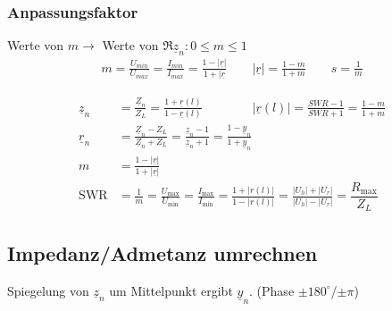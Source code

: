 \subsubsection{Anpassungsfaktor}
Werte von $ m \rightarrow$ Werte von $ \Re{\underline{z}_n}: 0 \leq m \leq1 $
\begin{align*}
	m = \frac{U_{min}}{U_{max}} = \frac{I_{min}}{I_{max}}=\frac{1-|\underline{r}|}{1+|\underline{r}} \qquad  |\underline{r}| = \frac{1-m}{1+m} \qquad s=\frac{1}{m}
\end{align*}
\begin{center}
    
\end{center}
\begin{align*}
    \underline{z}_n & = \frac{\underline{Z}_n}{Z_L} = \frac{1+\underline{r}(l)}{1-\underline{r}(l)} \qquad \qquad |\underline{r}(l)|=\frac{\si{SWR}-1}{\si{SWR}+1} = \frac{1-m}{1+m}
    \\
    \underline{r}_n & = \frac{\underline{Z}_n-Z_L}{\underline{Z}_n+Z_L}= \frac{\underline{z}_n-1}{\underline{z}_n+1}    = \frac{1-\underline{y}_n}{1+\underline{y}_n} \\
    m               & = \frac{1-|\underline{r}|}{1+|\underline{r}|}                                                                                                   \\
    \mathrm{SWR}               & = \frac{1}{m} = \frac{U_\text{max}}{U_\text{min}} = \frac{I_\text{max}}{I_\text{min}} = \frac{1+|r(l)|}{1-|r(l)|} = \frac{|U_h|+|U_r|}{|U_h|-|U_r|}= \dfrac{R_{\text{max}}}{Z_L}
\end{align*}

\subsection{Impedanz/Admetanz umrechnen}
Spiegelung von $ \underline{z}_n $ um Mittelpunkt ergibt $ \underline{y}_n $.  (Phase $\pm 180^{\circ}$/$\pm \pi$)



